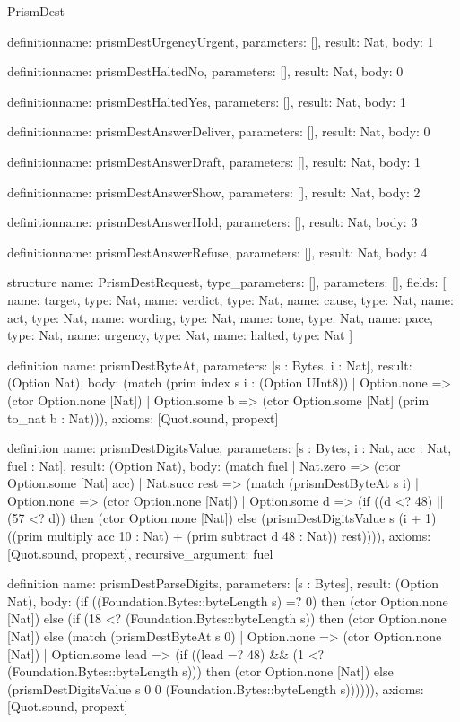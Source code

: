 \begin{lexlean}{PrismDest}
\begin{semanticmodule}
definition{name: prismDestUrgencyUrgent, parameters: [], result: Nat, body: 1}

definition{name: prismDestHaltedNo, parameters: [], result: Nat, body: 0}

definition{name: prismDestHaltedYes, parameters: [], result: Nat, body: 1}

definition{name: prismDestAnswerDeliver, parameters: [], result: Nat, body: 0}

definition{name: prismDestAnswerDraft, parameters: [], result: Nat, body: 1}

definition{name: prismDestAnswerShow, parameters: [], result: Nat, body: 2}

definition{name: prismDestAnswerHold, parameters: [], result: Nat, body: 3}

definition{name: prismDestAnswerRefuse, parameters: [], result: Nat, body: 4}

structure{
  name: PrismDestRequest,
  type_parameters: [],
  parameters: [],
  fields: [
    {name: target, type: Nat},
    {name: verdict, type: Nat},
    {name: cause, type: Nat},
    {name: act, type: Nat},
    {name: wording, type: Nat},
    {name: tone, type: Nat},
    {name: pace, type: Nat},
    {name: urgency, type: Nat},
    {name: halted, type: Nat}
  ]
}

definition{
  name: prismDestByteAt,
  parameters: [s : Bytes, i : Nat],
  result: (Option Nat),
  body: (match (prim index s i : (Option UInt8))
    | Option.none => (ctor Option.none [Nat])
    | Option.some b => (ctor Option.some [Nat] (prim to_nat b : Nat))),
  axioms: [Quot.sound, propext]
}

definition{
  name: prismDestDigitsValue,
  parameters: [s : Bytes, i : Nat, acc : Nat, fuel : Nat],
  result: (Option Nat),
  body: (match fuel
    | Nat.zero => (ctor Option.some [Nat] acc)
    | Nat.succ rest => (match (prismDestByteAt s i)
      | Option.none => (ctor Option.none [Nat])
      | Option.some d => (if ((d <? 48) || (57 <? d)) then (ctor Option.none [Nat]) else (prismDestDigitsValue s (i + 1) ((prim multiply acc 10 : Nat) + (prim subtract d 48 : Nat)) rest)))),
  axioms: [Quot.sound, propext],
  recursive_argument: fuel
}

definition{
  name: prismDestParseDigits,
  parameters: [s : Bytes],
  result: (Option Nat),
  body: (if ((Foundation.Bytes::byteLength s) =? 0) then (ctor Option.none [Nat]) else (if (18 <? (Foundation.Bytes::byteLength s)) then (ctor Option.none [Nat]) else (match (prismDestByteAt s 0)
    | Option.none => (ctor Option.none [Nat])
    | Option.some lead => (if ((lead =? 48) && (1 <? (Foundation.Bytes::byteLength s))) then (ctor Option.none [Nat]) else (prismDestDigitsValue s 0 0 (Foundation.Bytes::byteLength s)))))),
  axioms: [Quot.sound, propext]
}


\end{semanticmodule}
\end{lexlean}
